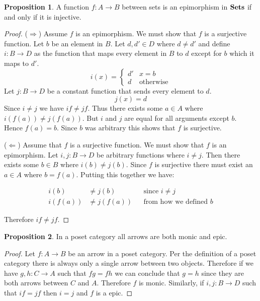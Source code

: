 \documentclass{article}
\theoremstyle{definition}
\newtheorem{proposition}{Proposition}
\newcommand{\arr}[3]{#1 : #2 \rightarrow #3}
\begin{document}
\begin{proposition}
  A function $\arr{f}{A}{B}$ between sets is an epimorphism in $\bf{Sets}$ if
  and only if it is injective.
\end{proposition}
\begin{proof}
  ($\Rightarrow$) Assume $f$ is an epimorphism. We must show that $f$ is a
  surjective function. Let $b$ be an element in $B$. Let $d, d' \in D$ where $d
  \neq d'$ and define $\arr{i}{B}{D}$ as the function that maps every element
  in $B$ to $d$ except for $b$ which it maps to $d'$.
  \[
    i(x) = \begin{cases}
      d' & x = b \\
      d & \text{otherwise}
    \end{cases}
  \]
  Let $\arr{j}{B}{D}$ be a constant function that sends every element to $d$.
  \[
    j(x) = d
  \]
  Since $i \neq j$ we have $if \neq jf$. Thus there exists some $a \in A$ where
  $i(f(a)) \neq j(f(a))$. But $i$ and $j$ are equal for all arguments except
  $b$. Hence $f(a) = b$. Since $b$ was arbitrary this shows that $f$ is
  surjective.

  ($\Leftarrow$) Assume that $f$ is a surjective function. We must show that $f$
  is an epimorphism. Let $\arr{i, j}{B}{D}$ be arbitrary functions where $i \neq
  j$. Then there exists some $b \in B$ where $i(b) \neq j(b)$. Since $f$ is
  surjective there must exist an $a \in A$ where $b = f(a)$. Putting this
  together we have:

  \begin{align*}
    i(b) &\neq j(b) && \text{since $i \neq j$} \\
    i(f(a)) &\neq j(f(a)) && \text{from how we defined $b$}
  \end{align*}

  Therefore $if \neq jf$.
\end{proof}

\begin{proposition}
  In a poset category all arrows are both monic and epic.
\end{proposition}
\begin{proof}
  Let $\arr{f}{A}{B}$ be an arrow in a poset category. Per the definition of a
  poset category there is always only a single arrow between two objects.
  Therefore if we have $\arr{g, h}{C}{A}$ such that $fg = fh$ we can conclude
  that $g = h$ since they are both arrows between $C$ and $A$. Therefore $f$ is
  monic. Similarly, if $\arr{i, j}{B}{D}$ such that $if = jf$ then $i = j$ and
  $f$ is a epic.
\end{proof}
 
\end{document}
